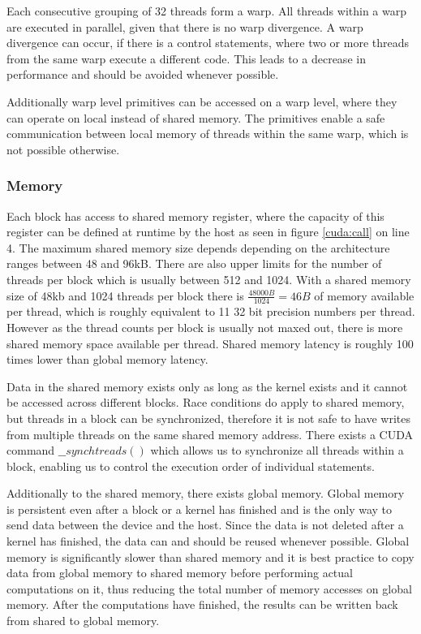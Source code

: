 \documentclass[]{article}
\begin{document}
Each consecutive grouping of 32 threads form a warp. All threads within a warp are executed in parallel, given that there is no warp divergence. A warp divergence can occur, if there is a control statements, where two or more threads from the same warp execute a different code. This leads to a decrease in performance and should be avoided whenever possible. \cite{warps}

Additionally warp level primitives can be accessed on a warp level, where they can operate on local instead of shared memory. The primitives enable a safe communication between local memory of threads within the same warp, which is not possible otherwise. \cite{CUDAGuide} \cite{warps}

\subsubsection{Memory}

Each block has access to shared memory register, where the capacity of this register can be defined at runtime by the host as seen in figure \ref{cuda:call} on line 4. The maximum shared memory size depends depending on the architecture ranges between 48 and 96kB. \cite{CUDAGuide} There are also upper limits for the number of threads per block which is usually between 512 and 1024. \cite{CUDAGuide} With a shared memory size of 48kb and 1024 threads per block there is $\frac{48000B}{1024} = 46B$ of memory available per thread, which is roughly equivalent to 11 32 bit precision numbers per thread. However as the thread counts per block is usually not maxed out, there is more shared memory space available per thread. Shared memory latency is roughly 100 times lower than global memory latency. \cite{sharedMem}

Data in the shared memory exists only as long as the kernel exists and it cannot be accessed across different blocks. Race conditions do apply to shared memory, but threads in a block can be synchronized, therefore it is not safe to have writes from multiple threads on the same shared memory address. There exists a CUDA command $\_\_synchtreads()$ which allows us to synchronize all threads within a block, enabling us to control the execution order of individual statements.

Additionally to the shared memory, there exists global memory. Global memory is persistent even after a block or a kernel has finished and is the only way to send data between the device and the host. Since the data is not deleted after a kernel has finished, the data can and should be reused whenever possible. Global memory is significantly slower than shared memory and it is best practice to copy data from global memory to shared memory before performing actual computations on it, thus reducing the total number of memory accesses on global memory. After the computations have finished, the results can be written back from shared to global memory. \cite{gMem}
\end{document}
